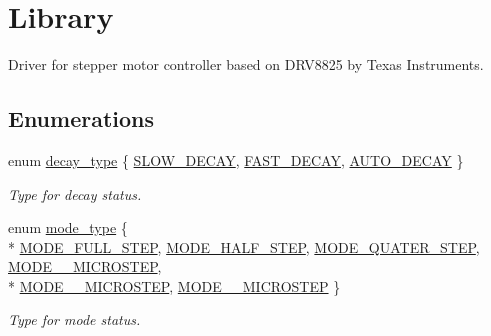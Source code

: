 \hypertarget{group__DRV8825}{\section{Library}
\label{group__DRV8825}
}


Driver for stepper motor controller based on D\-R\-V8825 by Texas Instruments.  


\subsection*{Enumerations}
\begin{DoxyCompactItemize}
\item 
enum \hyperlink{group__DRV8825_gafe05744bd777532cf059c0d7293a7ab8}{decay\-\_\-type} \{ \hyperlink{group__DRV8825_ggafe05744bd777532cf059c0d7293a7ab8a05f6a902065ce2f3355101cf657f4ba4}{S\-L\-O\-W\-\_\-\-D\-E\-C\-A\-Y}, 
\hyperlink{group__DRV8825_ggafe05744bd777532cf059c0d7293a7ab8af9716e06b54f75cbd7dedc154a7d49e2}{F\-A\-S\-T\-\_\-\-D\-E\-C\-A\-Y}, 
\hyperlink{group__DRV8825_ggafe05744bd777532cf059c0d7293a7ab8abbe5a117b6da07d1a52741cfff2e927a}{A\-U\-T\-O\-\_\-\-D\-E\-C\-A\-Y}
 \}
\begin{DoxyCompactList}\small\item\em Type for decay status. \end{DoxyCompactList}\item 
enum \hyperlink{group__DRV8825_ga19269c193c0c4866cdc4e5abd433f9fc}{mode\-\_\-type} \{ \\*
\hyperlink{group__DRV8825_gga19269c193c0c4866cdc4e5abd433f9fcaed3032a935a3b2a2ab90e2500dee1177}{M\-O\-D\-E\-\_\-\-F\-U\-L\-L\-\_\-\-S\-T\-E\-P}, 
\hyperlink{group__DRV8825_gga19269c193c0c4866cdc4e5abd433f9fca7bf7cb276c55a5c4e13149d1e18b320f}{M\-O\-D\-E\-\_\-\-H\-A\-L\-F\-\_\-\-S\-T\-E\-P}, 
\hyperlink{group__DRV8825_gga19269c193c0c4866cdc4e5abd433f9fcaf16653dd137a6079ff5399de04861835}{M\-O\-D\-E\-\_\-\-Q\-U\-A\-T\-E\-R\-\_\-\-S\-T\-E\-P}, 
\hyperlink{group__DRV8825_gga19269c193c0c4866cdc4e5abd433f9fca4db57f4a88897e48818d92a223cd72d7}{M\-O\-D\-E\-\_\-\_\-\-M\-I\-C\-R\-O\-S\-T\-E\-P}, 
\\*
\hyperlink{group__DRV8825_gga19269c193c0c4866cdc4e5abd433f9fcac75bcca2721976d5185711ca481ccbb0}{M\-O\-D\-E\-\_\-\_\-\-M\-I\-C\-R\-O\-S\-T\-E\-P}, 
\hyperlink{group__DRV8825_gga19269c193c0c4866cdc4e5abd433f9fcacb3d9ffb67d18343290fe5474bc1b4d5}{M\-O\-D\-E\-\_\-\_\-\-M\-I\-C\-R\-O\-S\-T\-E\-P}
 \}
\begin{DoxyCompactList}\small\item\em Type for mode status. \end{DoxyCompactList}\item 

\end{DoxyCompactItemize}
